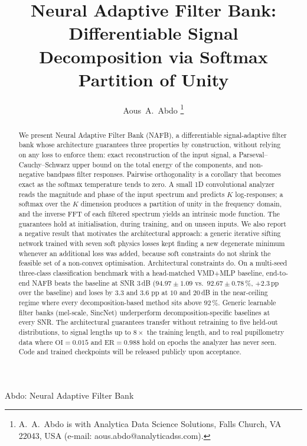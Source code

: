 \documentclass[journal]{IEEEtran}
\theoremstyle{remark}
\begin{document}
\title{Neural Adaptive Filter Bank: Differentiable Signal
Decomposition via Softmax Partition of Unity}

\author{Aous~A.~Abdo%
\thanks{A.~A.~Abdo is with Analytica Data Science Solutions,
Falls Church, VA 22043, USA (e-mail: aous.abdo@analyticadss.com).}}

%
{Abdo: Neural Adaptive Filter Bank}

\maketitle

\begin{abstract}
We present Neural Adaptive Filter Bank (NAFB), a differentiable
signal-adaptive filter bank whose architecture guarantees three
properties by construction, without relying on any loss to enforce
them: exact reconstruction of the input signal, a Parseval--Cauchy--Schwarz
upper bound on the total energy of the components, and non-negative
bandpass filter responses. Pairwise orthogonality is a corollary that
becomes exact as the softmax temperature tends to zero. A small 1D
convolutional analyzer reads the magnitude and phase of the input
spectrum and predicts $K$ log-responses; a softmax over the $K$
dimension produces a partition of unity in the frequency domain, and
the inverse FFT of each filtered spectrum yields an intrinsic mode
function. The guarantees hold at initialisation, during training, and
on unseen inputs. We also report a negative result that motivates the
architectural approach: a generic iterative sifting network trained
with seven soft physics losses kept finding a new degenerate minimum
whenever an additional loss was added, because soft constraints do
not shrink the feasible set of a non-convex optimisation.
Architectural constraints do. On a multi-seed three-class classification benchmark with a
head-matched VMD$+$MLP baseline, end-to-end NAFB beats the
baseline at SNR $3$\,dB ($94.97 \pm 1.09$ vs.\ $92.67 \pm 0.78$\,\%,
$+2.3$\,pp over the baseline)
and loses by $3.3$ and $3.6$ pp at $10$ and $20$\,dB in the
near-ceiling regime where every decomposition-based method sits above
$92$\,\%. Generic learnable filter banks (mel-scale, SincNet)
underperform decomposition-specific baselines at every SNR. The
architectural guarantees transfer without retraining to five held-out
distributions, to signal lengths up to $8\times$ the training length,
and to real pupillometry data where $\mathrm{OI}=0.015$ and
$\mathrm{ER}=0.988$ hold on epochs the analyzer has never seen. Code
and trained checkpoints will be released publicly upon acceptance.
\end{abstract}
\end{document}
